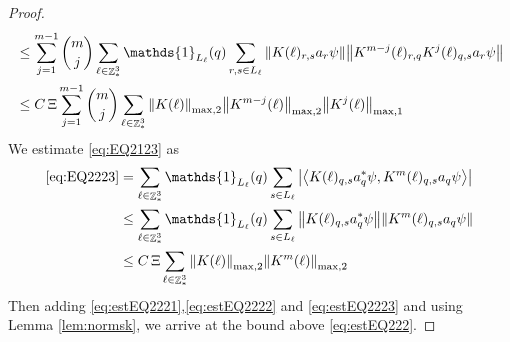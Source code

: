\documentclass[sn-mathphys, Numbered ,a4paper]{sn-jnl}%
\DeclareMathOperator{\Z}{\mathbb{Z}}
\newcommand{\eva}[1]{\left\langle #1 \right\rangle}
\theoremstyle{plain}
\theoremstyle{definition}
\theoremstyle{remark}
\theoremstyle{plain}
\theoremstyle{definition}
\theoremstyle{remark}
\begin{document}
{\begin{proof}
\begin{align}
	&\leq \sum\limits_{j=1}^{m-1} {{m}\choose j} \sum\limits_{\ell \in \Z^3_*}\mathds{1}_{L_{\ell}}(q) \sum\limits_{r,s\in L_{\ell}}  \norm{ K(\ell)_{r,s} a_{r}\psi}\norm{ K^{m-j}(\ell)_{r,q} K^{j}(\ell)_{q,s} a_{r} \psi } \nonumber\\
	&\leq C\,\Xi \sum\limits_{j=1}^{m-1} {{m}\choose j} \sum\limits_{\ell \in \Z^3_*} \norm{K(\ell)}_{\mathrm{max,2}} \norm{K^{m-j}(\ell)}_{\mathrm{max,2}} \norm{K^j(\ell)}_{\mathrm{max,1}} \label{eq:estEQ2222}
\end{align}
We estimate \eqref{eq:EQ2123} as 
\begin{align}
	\eqref{eq:EQ2223}
	&=\sum\limits_{\ell \in \Z^3_*} \mathds{1}_{L_{\ell}}(q) \sum\limits_{ s \in L_{\ell}} \abs{\eva{K(\ell)_{q,s} a^*_{q} \psi, K^m(\ell)_{q,s}  a_{q} \psi }} \nonumber\\
	&\leq \sum\limits_{\ell \in \Z^3_*} \mathds{1}_{L_{\ell}}(q) \sum\limits_{ s \in L_{\ell}} \norm{K(\ell)_{q,s} a^*_{q} \psi}\norm{ K^m(\ell)_{q,s}  a_{q} \psi } \nonumber\\
	&\leq C\,\Xi \sum\limits_{\ell \in \Z^3_*} \norm{K(\ell)}_{\mathrm{max,2}} \norm{K^m(\ell)}_{\mathrm{max,2}}  \label{eq:estEQ2223}
\end{align} 
Then adding \eqref{eq:estEQ2221},\eqref{eq:estEQ2222} and \eqref{eq:estEQ2223} and using Lemma \ref{lem:normsk}, we arrive at the bound above \eqref{eq:estEQ222}. 
\end{proof}}
\end{document}
